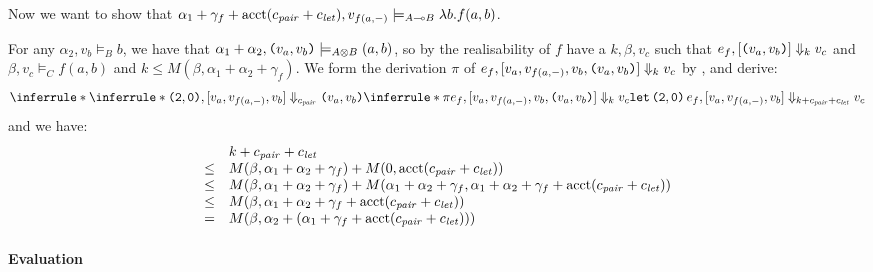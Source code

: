 \documentclass{workingnote}
\newcommand{\account}{\mathrm{acct}}
\begin{document}
Now we want to show that
$\alpha_1 + \gamma_f + \account(\cnstPair + \cnstLet), v_{f(a,-)}
\models_{A \multimap B} \lambda b. f(a,b)$.

For any $\alpha_2, v_b \models_B b$, we have that
$\alpha_1+\alpha_2, \texttt{(}v_a,v_b\texttt{)} \models_{A \otimes B} (a,b)$, so by
the realisability of $f$ have a $k, \beta, v_c$ such that
$e_f, [\texttt{(}v_a,v_b\texttt{)}] \Downarrow_k v_c$ and
$\beta, v_c \models_C f(a,b)$ and
$k \leq M(\beta, \alpha_1+\alpha_2+\gamma_f)$. We form the derivation
$\pi$ of $e_f, [v_a,v_{f(a,-)},v_b,\texttt{(}v_a,v_b\texttt{)}] \Downarrow_k v_c$
by , and derive:
\begin{displaymath}
  \inferrule*
  {\inferrule*
    { }
    {\Pair{\Idx{2},\Idx{0}}, [v_a,v_{f(a,-)},v_b] \Downarrow_{\cnstPair} \Pair{v_a,v_b}}
    \\
    \inferrule*
    {\pi}
    {e_f, [v_a,v_{f(a,-)},v_b,\Pair{v_a,v_b}] \Downarrow_k v_c}
  }
  {\Let\,\Pair{\Idx{2},\Idx{0}}\,e_f, [v_a,v_{f(a,-)},v_b] \Downarrow_{k+\cnstPair+\cnstLet} v_c}
\end{displaymath}
and we have:
\begin{displaymath}
  \begin{array}{cl}
    &k+\cnstPair+\cnstLet \\
    \leq&M(\beta,\alpha_1+\alpha_2+\gamma_f) + M(0,\account(\cnstPair + \cnstLet))\\
    \leq&M(\beta,\alpha_1+\alpha_2+\gamma_f) + M(\alpha_1+\alpha_2+\gamma_f,\alpha_1+\alpha_2+\gamma_f + \account(\cnstPair + \cnstLet))\\
    \leq&M(\beta,\alpha_1+\alpha_2+\gamma_f + \account(\cnstPair + \cnstLet))\\
    =   &M(\beta,\alpha_2 + (\alpha_1+\gamma_f + \account(\cnstPair + \cnstLet)))\\
  \end{array}
\end{displaymath}

\paragraph{Evaluation}
\end{document}
